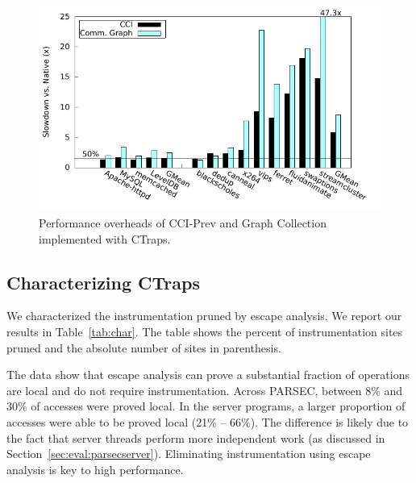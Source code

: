 \documentclass[preprint,9pt]{sigplanconf}
\newcommand{\ctraps}{CTraps\xspace}
\begin{document}
\begin{figure}
\centering
\includegraphics[width=.9\columnwidth]{plots/appperf.pdf}
\caption{\label{fig:perfapps}Performance overheads of CCI-Prev and Graph Collection implemented with \ctraps.}
\end{figure}


\subsection{Characterizing \ctraps}
\label{sec:char}
We characterized the instrumentation pruned by escape analysis.  We report our
results in Table~\ref{tab:char}.  The table shows the percent of
instrumentation sites pruned and the absolute number of sites in parenthesis.


The data show that escape analysis can prove a substantial fraction of
operations are local and do not require instrumentation.  Across PARSEC,
between 8\% and 30\% of accesses were proved local.  In the server programs, a
larger proportion of accesses were able to be proved local (21\% -- 66\%).  The
difference is likely due to the fact that server threads perform more
independent work (as discussed in Section~\ref{sec:eval:parsecserver}).
Eliminating instrumentation using escape analysis is key to high performance.  
\end{document}
